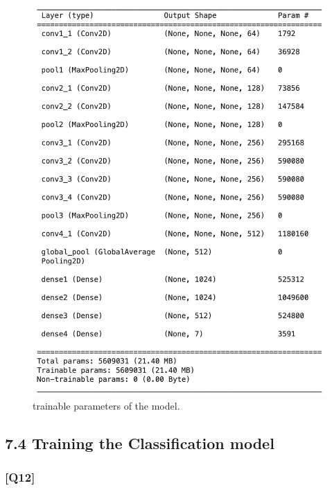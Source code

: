 \documentclass{article}
\begin{document}
\begin{figure}[!ht]
    \centering
    \includegraphics[width=\textwidth]{./pic/trainable_para_model2.png}
    \caption{trainable parameters of the model.}
    \label{fig:trainable_parameters_class}
\end{figure}


\subsection*{7.4 Training the Classification model}

\subsubsection*{[Q12]}
\end{document}

